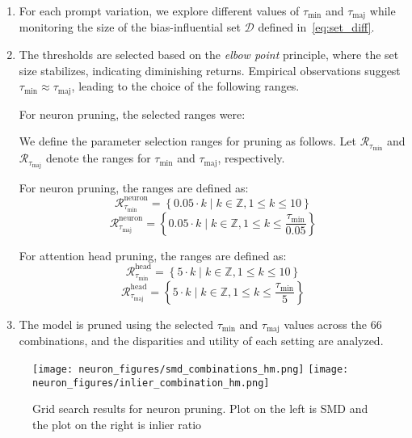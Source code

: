 \begin{enumerate}
    \item For each prompt variation, we explore different values of $\tau_{\text{min}}$ and $\tau_{\text{maj}}$ while monitoring the size of the bias-influential set $\mathcal{D}$ defined in~\autoref{eq:set_diff}. 
    \item The thresholds are selected based on the \textit{elbow point} principle, where the set size stabilizes, indicating diminishing returns. Empirical observations suggest $\tau_{\text{min}} \approx \tau_{\text{maj}}$, leading to the choice of the following ranges.
    
    For neuron pruning, the selected ranges were:
    
    We define the parameter selection ranges for pruning as follows. Let $\mathcal{R}_{\tau_{\text{min}}}$ and $\mathcal{R}_{\tau_{\text{maj}}}$ denote the ranges for $\tau_{\text{min}}$ and $\tau_{\text{maj}}$, respectively.
    
    For neuron pruning, the ranges are defined as:
    \begin{equation}
        \mathcal{R}_{\tau_{\text{min}}}^{\text{neuron}} = \left\{ 0.05 \cdot k \mid k \in \mathbb{Z}, 1 \leq k \leq 10 \right\}
    \end{equation}
    \begin{equation}
        \mathcal{R}_{\tau_{\text{maj}}}^{\text{neuron}} = \left\{ 0.05 \cdot k \mid k \in \mathbb{Z}, 1 \leq k \leq \frac{\tau_{\text{min}}}{0.05} \right\}
    \end{equation}
    
    For attention head pruning, the ranges are defined as:
    \begin{equation}
        \mathcal{R}_{\tau_{\text{min}}}^{\text{head}} = \left\{ 5 \cdot k \mid k \in \mathbb{Z}, 1 \leq k \leq 10 \right\}
    \end{equation}
    \begin{equation}
        \mathcal{R}_{\tau_{\text{maj}}}^{\text{head}} = \left\{ 5 \cdot k \mid k \in \mathbb{Z}, 1 \leq k \leq \frac{\tau_{\text{min}}}{5} \right\}
    \end{equation}
    
    \item The model is pruned using the selected $\tau_{\text{min}}$ and $\tau_{\text{maj}}$ values across the 66 combinations, and the disparities and utility of each setting are analyzed.
    
\end{enumerate}
\begin{figure}[t]
    \centering
    \texttt{[image: neuron\_figures/smd\_combinations\_hm.png]}
    \texttt{[image: neuron\_figures/inlier\_combination\_hm.png]}
    \caption{Grid search results for neuron pruning. Plot on the left is SMD and the plot on the right is inlier ratio}
    \label{fig:nueron-grid-search}
\end{figure}

